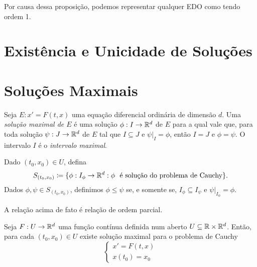 Por causa dessa proposição, podemos representar qualquer EDO como tendo ordem 1.

\section{Existência e Unicidade de Soluções}



\section{Soluções Maximais}

\begin{defi}
	Seja $E: x'=F(t,x)$ uma equação diferencial ordinária de dimensão $d$. Uma \emph{solução maximal de $E$} é uma solução $\phi: I \to \mathbb{R}^d$ de $E$ para a qual vale que, para toda solução $\psi: J \to \mathbb{R}^d$ de $E$ tal que $I \subseteq J$ e $\psi|_I = \phi$, então $I = J$ e $\phi = \psi$. O intervalo $I$ é o \emph{intervalo maximal}.
\end{defi}

\begin{defi}
	Dado $(t_0,x_0) \in U$, defina
	\begin{equation*}
	S_{(t_0,x_0)} \coloneqq \{\phi: I_\phi \to \mathbb{R}^d : \phi \text{\ \ é solução do problema de Cauchy}\}.
	\end{equation*}
Dados $\phi ,\psi \in S_{(t_0,x_0)}$, definimos $\phi \leq \psi $ se, e somente se, $I_{\phi } \subseteq I_{\psi}$ e $\psi|_{I_\phi} = \phi $.
\end{defi}

\begin{prop}
	A relação acima de fato é relação de ordem parcial.
\end{prop}

\begin{teo}
	Seja $F: U \to \mathbb{R}^d$ uma função contínua definida num aberto $U \subseteq \mathbb{R} \times \mathbb{R}^d$. Então, para cada $(t_0,x_0) \in U$ existe solução maximal para o problema de Cauchy
	\begin{equation*}
	\begin{cases}
		x' = F(t,x) \\
		x(t_0)=x_0
	\end{cases}
	\end{equation*}
\end{teo}